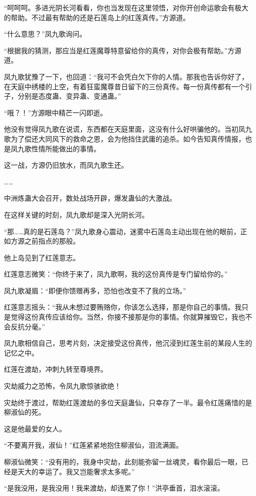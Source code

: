 \begin{this_body}
“呵呵呵。多进光阴长河看看，你也当发现在这里领悟，对你开创命运歌会有极大的帮助。不过最有帮助的还是石莲岛上的红莲真传。”方源道。

“什么意思？”凤九歌询问。

“根据我的猜测，那应当是红莲魔尊特意留给你的真传，对你会极有帮助。”方源道。

凤九歌犹豫了一下，也回道：“我可不会凭白欠下你的人情。那我也告诉你好了，在天庭中绣楼的上空，有着狂蛮魔尊昔日留下的三份真传。每一份真传都有一个引子，分别是态度蛊、变异蛊、变通蛊。”

“哦？！”方源眼中精芒一闪即逝。

他没有觉得凤九歌在说谎，东西都在天庭里面，这没有什么好哄骗他的。当初凤九歌为了偿还大同风下的救命之恩，会为他挡住武庸的追杀。如今告知真传情报，也是凤九歌性情所能做出的事情。

这一战，方源仍旧放水，而凤九歌生还。

……

中洲炼蛊大会召开，数处战场开辟，爆发蛊仙的大激战。

在这样关键的时刻，凤九歌却是深入光阴长河。

“那……真的是石莲岛？”凤九歌身心震动，迷雾中石莲岛主动出现在他的眼前，正如方源之前指点的那般。

他上岛见到了红莲意志。

红莲意志微笑：“你终于来了，凤九歌啊，我的这份真传是专门留给你的。”

凤九歌凝眉：“即便你馈赠再多，恐怕也改变不了我的立场。”

红莲意志摇头：“我从未想过要贿赂你，你该怎么选择，那是你自己的事情。我只是觉得这份真传应该给你。当然，你接不接那是你的事情。你就算摧毁它，我也不会反抗分毫。”

凤九歌相信自己，思考片刻，决定接受这份真传，他沉浸到红莲生前的某段人生的记忆之中。

红莲在渡劫，冲刺九转至尊境界。

灾劫威力之恐怖，令凤九歌惊骇欲绝！

灾劫终于渡过，帮助红莲渡劫的多位天庭蛊仙，只幸存了一半。最令红莲痛惜的是柳淑仙的死。

这是他最爱的女人。

“不要离开我，淑仙！”红莲紧紧地抱住柳淑仙，泪流满面。

柳淑仙微笑：“没有用的，我身中灾劫，此刻能弥留一丝魂灵，看你最后一眼，已经是天大的幸运了。我又岂能奢求太多呢。”

“是我没用，是我没用！我来渡劫，却连累了你！”洪亭垂首，泪水滚滚。


\end{this_body}
